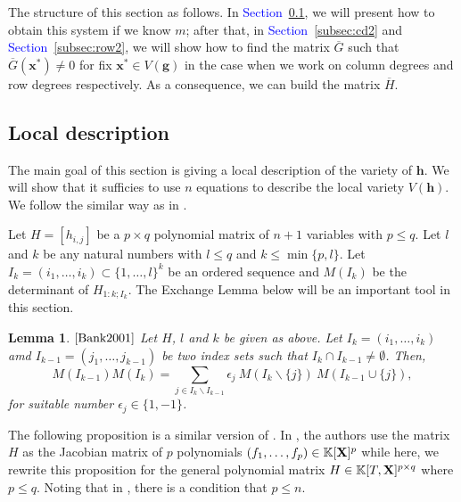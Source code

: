 \documentclass[11pt]{article}
\numberwithin{Property}{section}
\numberwithin{Theorem}{section}
\numberwithin{Proposition}{section}
\newtheorem{Lemma}{Lemma}%
\numberwithin{Lemma}{section}
\numberwithin{Corollary}{section}
\numberwithin{Definition}{section}
\numberwithin{Remark}{section}
\numberwithin{Conjecture}{section}
\numberwithin{Problem}{section}
\numberwithin{Claim}{section}
\theoremstyle{definition}
\numberwithin{Example}{section}
\def\h {\ensuremath{\mathbf{h}}}
\def\g {\ensuremath{\mathbf{g}}}
\renewcommand{\leq}{\leqslant}
\def\bar{\overline}
\newcommand{\field}{\mathbb{K}} %
\newcommand{\mat}[1]{\mathbf{\MakeUppercase{#1}}} %
\newcommand{\improve}[1]{\textcolor{blue}{#1}} %
\begin{document}
The structure of this section as follows. In \improve{Section~\ref{subsec:local}}, we will present how to obtain this system if we know $m$; after that, in \improve{Section~\ref{subsec:cd2}} and \improve{Section~\ref{subsec:row2}}, we will show how to find the matrix $\bar{G}$ such that $\bar{G}(\mathbf{x}^*) \ne 0$ for fix $\mathbf{x}^* \in V(\g)$ in the case when we work on column degrees and row degrees respectively. As a consequence, we can build the matrix $\bar{H}$. 
\subsection{Local description}
\label{subsec:local}
The main goal of this section is giving a local description of the variety of $\h$. We will show that it sufficies to use $n$ equations to describe the local variety $V(\h)$. We follow the similar way as in \cite[Section ~ 2.2]{Bank2001}. 

Let $H = [h_{i,j}]$ be a $p \times q$ polynomial matrix of $n+1$ variables with $p \leq q$. Let $l$ and $k$ be any natural numbers with $l \leq q$ and $k \leq \min\{p,l\}$. Let $I_k = (i_1, \ldots, i_k) \subset \{1, \ldots, l\}^k$ be an ordered sequence and $M(I_k)$ be the determinant of $H_{1:k;I_k}$. The Exchange Lemma below will be an important tool in this section. 
\begin{Lemma}$\cite{Bank2001}$ Let $H$, $l$ and $k$ be given as above. Let $I_k = (i_1, \ldots, i_k)$ amd $I_{k-1} = (j_1, \ldots, j_{k-1})$ be two index sets such that $I_k \cap I_{k-1} \ne \emptyset$. Then, 
\[
M({I_{k-1}})M(I_k) = \sum_{j \in I_k \backslash I_{k-1}} \epsilon_j \ M(I_k \backslash \{j\}) \ M(I_{k-1} \cup \{j\}), 
\] for suitable number $\epsilon_j \in \{1, -1\}$. \label{exchange}
\end{Lemma}
The following proposition is a similar version of \cite[Proposition ~ 5]{Bank2001}. In \cite{Bank2001}, the authors use the matrix $H$ as the Jacobian matrix of $p$ polynomials $(f_1, \ldots, f_p) \in \field[\mat{X}]^p$ while here, we rewrite this proposition for the general polynomial matrix $H \in \field[T,\mat{X}]^{p \times q}$ where $p \leq q$. Noting that in \cite{Bank2001}, there is a condition that $p \leq n$. 
\end{document}
